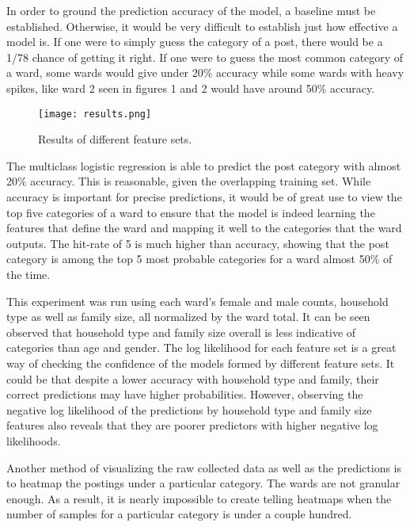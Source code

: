 \documentclass[12pt]{article}
\begin{document}
   In order to ground the prediction accuracy of the model, a baseline must be established. Otherwise, it would be very difficult to establish just how effective a model is. 
   If one were to simply guess the category of a post, there would be a 1/78 chance of getting it right. If one were to guess the most common category of a ward, some wards would give under 20\% accuracy while some wards with heavy spikes, like ward 2 seen in figures 1 and 2 would have around 50\% accuracy. 

   \begin{figure}[h]
   \centering
   \texttt{[image: results.png]}
   \caption{Results of different feature sets.}
   \end{figure}
   The multiclass logistic regression is able to predict the post category with almost 20\% accuracy. This is reasonable, given the overlapping training set. 
   While accuracy is important for precise predictions, it would be of great use to view the top five categories of a ward to ensure that the model is indeed learning the features that define the ward and mapping it well to the categories that the ward outputs. The hit-rate of 5 is much higher than accuracy, showing that the post category is among the top 5 most probable categories for a ward almost 50\% of the time. 

   This experiment was run using each ward's female and male counts, household type as well as family size, all normalized by the ward total. 
   It can be seen observed that household type and family size overall is less indicative of categories than age and gender. The log likelihood for each feature set is a great way of checking the confidence of the models formed by different feature sets. It could be that despite a lower accuracy with household type and family, their correct predictions may have higher probabilities. However, observing the negative log likelihood of the predictions by household type and family size features also reveals that they are poorer predictors with higher negative log likelihoods.

   Another method of visualizing the raw collected data as well as the predictions is to heatmap the postings under a particular category.   
   The wards are not granular enough. As a result, it is nearly impossible to create telling heatmaps when the number of samples for a particular category is under a couple hundred. 
\end{document}
